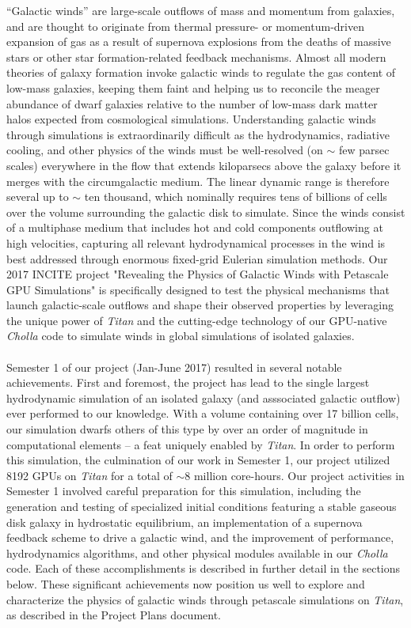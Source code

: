 \documentclass[11pt,letterpaper,english]{article}
\begin{document}
``Galactic winds'' are large-scale outflows of mass and momentum from galaxies, and are thought to originate from thermal pressure- or momentum-driven expansion of gas as a result of supernova explosions
from the deaths of massive stars or other star formation-related feedback mechanisms. Almost all modern
theories of galaxy formation invoke galactic winds to regulate the gas content of low-mass galaxies,
keeping them faint and helping us to reconcile the meager abundance of dwarf galaxies relative to the number of low-mass dark matter halos expected from cosmological simulations. 
Understanding galactic winds through simulations is extraordinarily difficult as the
hydrodynamics, radiative cooling, and other physics of the winds must be well-resolved (on $\sim$ few parsec scales) everywhere in the flow that extends kiloparsecs above the galaxy before it merges with the circumgalactic medium. The linear dynamic range is therefore several up to $\sim$ ten thousand, which nominally requires tens of billions of cells over the volume surrounding the galactic disk
to simulate. Since the winds consist of a multiphase medium that includes hot and cold components outflowing at high velocities, capturing all relevant hydrodynamical processes in the wind is best addressed through enormous fixed-grid Eulerian simulation methods.
Our 2017 INCITE project "Revealing the Physics of Galactic Winds with Petascale GPU Simulations" is specifically designed to test the physical mechanisms that launch galactic-scale outflows and shape
their observed properties by leveraging
the unique power of \textit{Titan} and the cutting-edge technology of our GPU-native \textit{Cholla}
code to simulate winds in global simulations of isolated galaxies.
~\\~\\
Semester 1 of our project (Jan-June 2017) resulted in several notable achievements. First and foremost, the project has lead to the single largest hydrodynamic simulation of an isolated galaxy (and asssociated galactic outflow) ever performed to our knowledge. With a volume containing over 17 billion cells, our simulation dwarfs others of this type by over an order of magnitude in computational elements -- a feat uniquely enabled by \textit{Titan}. In order to perform this simulation, the culmination of our work in Semester 1, our project utilized 8192 GPUs on \textit{Titan} for a total of $\sim$8 million core-hours. Our project activities in Semester 1 involved careful preparation for this simulation, including the generation and testing of specialized initial conditions featuring a stable gaseous disk galaxy in hydrostatic equilibrium, an implementation of a supernova feedback scheme to drive a galactic wind, and the improvement of performance,
hydrodynamics algorithms, and other physical modules available in our \textit{Cholla} code. Each of these accomplishments is described in further detail in the sections below. These significant achievements
now position us well to explore and characterize the physics of galactic winds through petascale simulations
on \textit{Titan}, as described in the Project Plans document.
\end{document}
